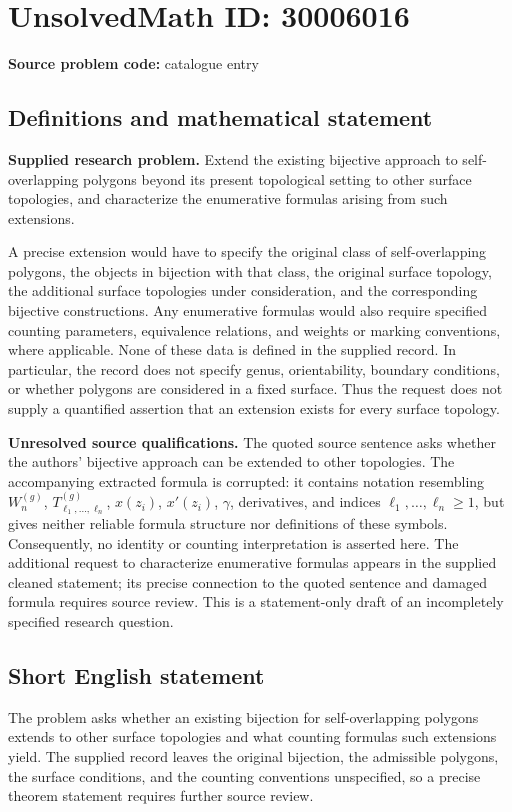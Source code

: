 \documentclass[11pt]{article}
\begin{document}
\section*{UnsolvedMath ID: 30006016}
\textbf{Source problem code:} catalogue entry
\subsection{Definitions and mathematical statement}
\textbf{Supplied research problem.} Extend the existing bijective approach to self-overlapping polygons beyond its present topological setting to other surface topologies, and characterize the enumerative formulas arising from such extensions.

A precise extension would have to specify the original class of self-overlapping polygons, the objects in bijection with that class, the original surface topology, the additional surface topologies under consideration, and the corresponding bijective constructions. Any enumerative formulas would also require specified counting parameters, equivalence relations, and weights or marking conventions, where applicable. None of these data is defined in the supplied record. In particular, the record does not specify genus, orientability, boundary conditions, or whether polygons are considered in a fixed surface. Thus the request does not supply a quantified assertion that an extension exists for every surface topology.

\textbf{Unresolved source qualifications.} The quoted source sentence asks whether the authors' bijective approach can be extended to other topologies. The accompanying extracted formula is corrupted: it contains notation resembling \(W_n^{(g)}\), \(T_{\ell_1,\ldots,\ell_n}^{(g)}\), \(x(z_i)\), \(x'(z_i)\), \(\gamma\), derivatives, and indices \(\ell_1,\ldots,\ell_n\geq 1\), but gives neither reliable formula structure nor definitions of these symbols. Consequently, no identity or counting interpretation is asserted here. The additional request to characterize enumerative formulas appears in the supplied cleaned statement; its precise connection to the quoted sentence and damaged formula requires source review. This is a statement-only draft of an incompletely specified research question.
\subsection{Short English statement}
The problem asks whether an existing bijection for self-overlapping polygons extends to other surface topologies and what counting formulas such extensions yield. The supplied record leaves the original bijection, the admissible polygons, the surface conditions, and the counting conventions unspecified, so a precise theorem statement requires further source review.
\end{document}
